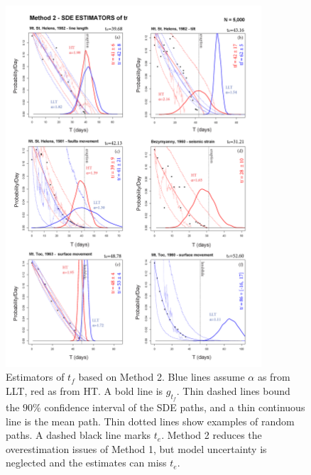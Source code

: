 \documentclass{article}
\begin{document}
\begin{figure}[H]\vskip-0.5cm
\centering
\includegraphics[width=0.85\textwidth]{Fig6_plus.png}
\caption{Estimators of $t_f$ based on Method 2. Blue lines assume $\alpha$ as from LLT, red as from HT. A bold line is $g_{t_f}$. Thin dashed lines bound the $90\%$ confidence interval of the SDE paths, and a thin continuous line is the mean path. Thin dotted lines show examples of random paths. A dashed black line marks $t_e$. Method 2 reduces the overestimation issues of Method 1, but model uncertainty is neglected and the estimates can miss $t_e$.}
\label{Fig6}
\end{figure}
\end{document}
